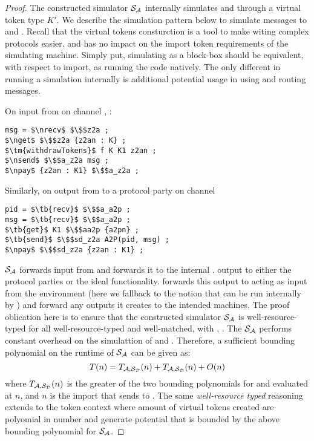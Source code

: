 \begin{proof}
The constructed simulator $\mathcal{S}_\mathcal{A}$ internally simulates \Dummysim and \Adversary through a virtual token type $K'$. 
We describe the simulation pattern below to simulate messages to \Dummysim and \Adversary.
Recall that the virtual tokens consturction is a tool to make witing complex protocols easier, and has no impact on the import token requirements of the simulating machine.
Simply put, simulating as a block-box should be equivalent, with respect to import, as \Simulator running the code natively. 
The only different in running a simulation internally is additional potential usage in using  and routing messages.

On input from \Environment on channel , \Simulator:
\begin{lstlisting}[basicstyle=\small\BeraMonottFamily, frame=single,  mathescape, label={lst:sim}]
msg = $\nrecv$ $\$$z2a ;
$\nget$ $\$$z2a {z2an : K} ;
$\tm{withdrawTokens}$ f K K1 z2an ;
$\nsend$ $\$$a_z2a msg ;
$\npay$ {z2an : K1} $\$$a_z2a ; 
\end{lstlisting}

Similarly, on output from \Adversary to a protocol party on channel 
\begin{lstlisting}[basicstyle=\small\BeraMonottFamily, frame=single,  mathescape]
pid = $\tb{recv}$ $\$$a_a2p ;
msg = $\tb{recv}$ $\$$a_a2p ;
$\tb{get}$ K1 $\$$aa2p {a2pn} ;
$\tb{send}$ $\$$sd_z2a A2P(pid, msg) ;
$\npay$ $\$$sd_z2a {z2an : K1} ;
\end{lstlisting}

$\mathcal{S}_\mathcal{A}$ forwards input from \Environment and forwards it to the internal \Adversary. 
\Adversary output to either the protocol parties or the ideal functionality. 
\Simulator forwards this output to \Dummysim acting as input from the environment (here we fallback to the notion that \Adversary can be run internally by \Environment) and forward any outputs it creates to the intended machines.
The proof oblication here is to ensure that the constructed simulator $\mathcal{S}_\mathcal{A}$ is well-resource-typed for all well-resource-typed and well-matched, with \Environment, \Adversary.
The $\mathcal{S}_\mathcal{A}$ performs constant overhead on the simulattion of \Adversary and \Dummysim. Therefore, a sufficient bounding polynomial on the runtime of $\mathcal{S}_\mathcal{A}$ can be given as:
\[
T(n) = T_{\mathcal{A},\mathcal{S}_{\mathcal{D}}}(n) + T_{\mathcal{A},\mathcal{S}_{\mathcal{D}}}(n) + O(n)
\]
where $T_{\mathcal{A},\mathcal{S}_{\mathcal{D}}}(n)$ is the greater of the two bounding polynomials for \Dummysim and \Adversary evaluated at $n$, and $n$ is the import that \Environment sends to \Adversary. 
The same \textit{well-resource typed} reasoning extends to the token context where amount of virtual tokens created are polyomial in number and generate potential that is bounded by the above bounding polynomial for $\mathcal{S}_\mathcal{A}$.
\end{proof}

